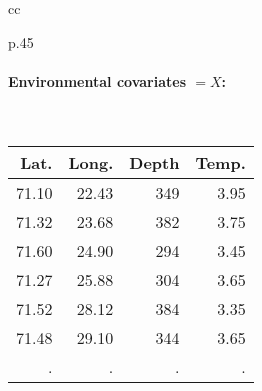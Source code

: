 \documentclass[8pt]{beamer}
\begin{document}
{\begin{tabular}{cc}
\begin{tabular}{p{}}
      \paragraph{Environmental covariates $=X$:} ~ \\
        {\footnotesize \begin{tabular}{rrrr}
        Lat. & Long. & Depth & Temp. \\
        \hline
        71.10 & 22.43 & 349 & 3.95 \\
        71.32 & 23.68 & 382 & 3.75 \\
        71.60 & 24.90 & 294 & 3.45 \\
        71.27 & 25.88 & 304 & 3.65 \\
        71.52 & 28.12 & 384 & 3.35 \\
        71.48 & 29.10 & 344 & 3.65 \\
        . & . & . & .
      \end{tabular}} 
    \end{tabular}
  \end{tabular}
  
}
\end{document}

